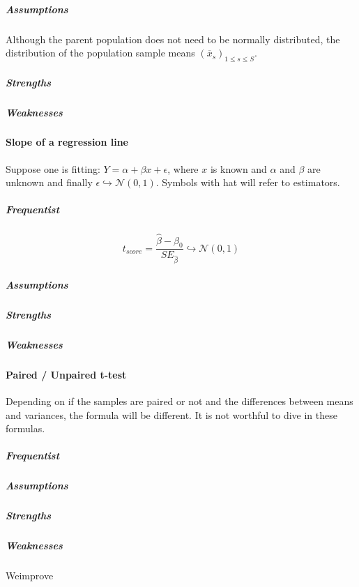 \subparagraph{Assumptions}
Although the parent population does not need to be normally distributed, the distribution
of the population sample means $\left(\overline{x}_{s}\right)_{1\leq s\leq S}$.\\
\subparagraph{Strengths}
\subparagraph{Weaknesses}


\paragraph{Slope of a regression line}
Suppose one is fitting: $Y = \alpha + \beta x + \epsilon$, where $x$ is known and $\alpha$ and $\beta$ are unknown
and finally $\epsilon \hookrightarrow \mathcal{N(0, 1)}$.
Symbols with hat will refer to estimators.
\subparagraph{Frequentist}
$$t_{score} = \dfrac{\hat{\beta} - \beta_{0}}{SE_{\hat{\beta}}} \hookrightarrow \mathcal{N}(0, 1)$$

\subparagraph{Assumptions}
\subparagraph{Strengths}
\subparagraph{Weaknesses}

\paragraph{Paired / Unpaired  t-test}
Depending on if the samples are paired or not and the differences between means and variances, the formula will be different. 
It is not worthful to dive in these formulas.
\subparagraph{Frequentist}
\subparagraph{Assumptions}
\subparagraph{Strengths}
\subparagraph{Weaknesses}

Weimprove
